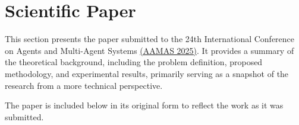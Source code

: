 \section{Scientific Paper}


This section presents the paper submitted to the 24th International Conference on Agents and Multi-Agent Systems \href{https://aamas2025.org/}{(AAMAS 2025)}. It provides a summary of the theoretical background, including the problem definition, proposed methodology, and experimental results, primarily serving as a snapshot of the research from a more technical perspective.\tinydouble

\noindent
The paper is included below in its original form to reflect the work as it was submitted.

\newpage

{}


{}

{}

{}



{}



{}

{}



{}

{}

